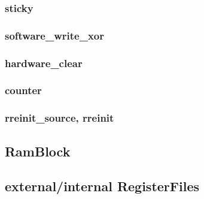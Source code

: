 \documentclass[12pt,a4paper]{article}
\begin{document}
\subsubsection{sticky}

\subsubsection{software\_write\_xor}

\subsubsection{hardware\_clear}

\subsubsection{counter}

\subsubsection{rreinit\_source, rreinit}

\subsection{RamBlock}

\subsection{external/internal RegisterFiles}
\end{document}
